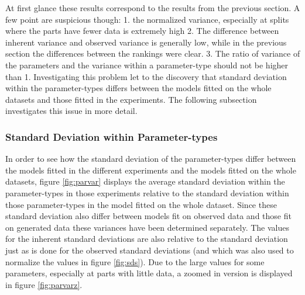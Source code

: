 \documentclass{scrartcl}
\begin{document}
At first glance these results correspond to the results from the previous section. A few point are suspicious though: 1. the normalized variance, especially at splits where the parts have fewer data is extremely high 2. The difference between inherent variance and observed variance is generally low, while in the previous section the differences between the rankings were clear. 3. The ratio of variance of the parameters and the variance within a parameter-type should not be higher than 1. Investigating this problem let to the discovery that standard deviation within the parameter-types differs between the models fitted on the whole datasets and those fitted in the experiments. The following subsection investigates this issue in more detail.


\subsubsection{Standard Deviation within Parameter-types}
\label{sec:parvar}
In order to see how the standard deviation of the parameter-types differ between the models fitted in the different experiments and the models fitted on the whole datasets, figure \ref{fig:parvar} displays the average standard deviation within the parameter-types in those experiments relative to the standard deviation within those parameter-types in the model fitted on the whole dataset. Since these standard deviation also differ between models fit on observed data and those fit on generated data these variances have been determined separately. The values for the inherent standard deviations are also relative to the standard deviation just as is done for the observed standard deviations (and which was also used to normalize the values in figure \ref{fig:sds}). Due to the large values for some parameters, especially at parts with little data, a zoomed in version is displayed in figure \ref{fig:parvarz}. 
\end{document}
